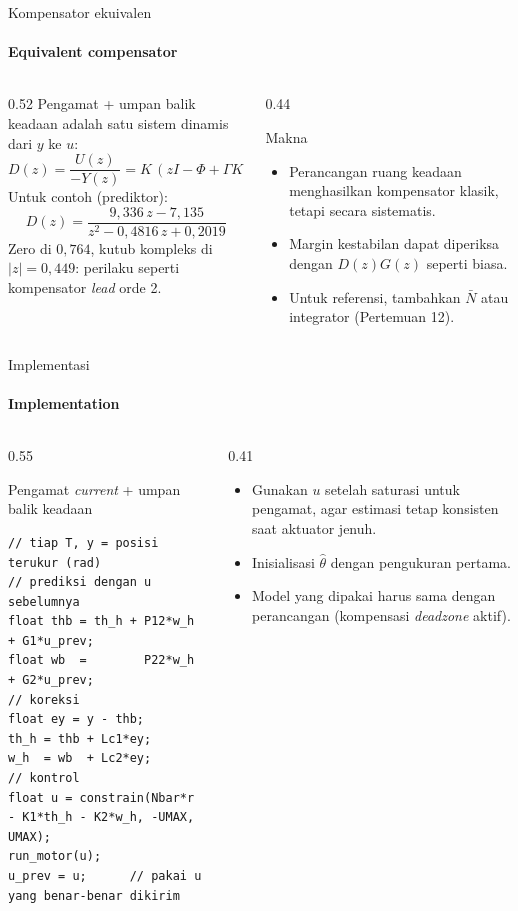 \documentclass[aspectratio=169,10pt]{beamer}
\begin{document}
\begin{frame}{Kompensator ekuivalen}
	\framesubtitle{Equivalent compensator}
	\begin{columns}[T]
		\begin{column}{0.52\textwidth}
			\small
			Pengamat + umpan balik keadaan adalah satu sistem dinamis dari $y$ ke $u$:
			\[
				D(z) = \frac{U(z)}{-Y(z)} = K\,(zI - \Phi + \Gamma K + LC)^{-1}L
			\]
			Untuk contoh (prediktor):
			\[
				D(z) = \frac{9{,}336\,z - 7{,}135}{z^2 - 0{,}4816\,z + 0{,}2019}
			\]
			Zero di $0{,}764$, kutub kompleks di $|z| = 0{,}449$: perilaku seperti kompensator \textit{lead} orde 2.
		\end{column}
		\begin{column}{0.44\textwidth}
			\begin{block}{Makna}
				\small
				\begin{itemize}
					\item Perancangan ruang keadaan menghasilkan kompensator klasik, tetapi secara sistematis.
					\item Margin kestabilan dapat diperiksa dengan $D(z)G(z)$ seperti biasa.
					\item Untuk referensi, tambahkan $\bar N$ atau integrator (Pertemuan 12).
				\end{itemize}
			\end{block}
		\end{column}
	\end{columns}
\end{frame}

\begin{frame}[fragile]{Implementasi}
	\framesubtitle{Implementation}
	\begin{columns}[T]
		\begin{column}{0.55\textwidth}
			\begin{block}{Pengamat \textit{current} + umpan balik keadaan}
				\scriptsize
\begin{verbatim}
// tiap T, y = posisi terukur (rad)
// prediksi dengan u sebelumnya
float thb = th_h + P12*w_h + G1*u_prev;
float wb  =        P22*w_h + G2*u_prev;
// koreksi
float ey = y - thb;
th_h = thb + Lc1*ey;
w_h  = wb  + Lc2*ey;
// kontrol
float u = constrain(Nbar*r - K1*th_h - K2*w_h, -UMAX, UMAX);
run_motor(u);
u_prev = u;      // pakai u yang benar-benar dikirim
\end{verbatim}
			\end{block}
		\end{column}
		\begin{column}{0.41\textwidth}
			\small
			\begin{itemize}
				\item Gunakan $u$ setelah saturasi untuk pengamat, agar estimasi tetap konsisten saat aktuator jenuh.
				\item Inisialisasi $\hat\theta$ dengan pengukuran pertama.
				\item Model yang dipakai harus sama dengan perancangan (kompensasi \textit{deadzone} aktif).
			\end{itemize}
		\end{column}
	\end{columns}
\end{frame}
\end{document}
